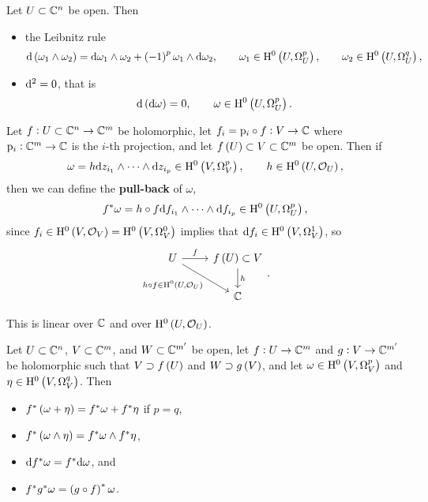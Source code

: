 \begin{proposition}
Let $ U \subset \mathbb{C}^n $ be open. Then
\begin{itemize}
\item the Leibnitz rule
$$ \d\br{\omega_1 \wedge \omega_2} = \d\omega_1 \wedge \omega_2 + \br{-1}^p \omega_1 \wedge \d\omega_2, \qquad \omega_1 \in \H^0\br{U, \Omega_U^p}, \qquad \omega_2 \in \H^0\br{U, \Omega_U^q}, $$
\item $ \mathrm{d}^2 = 0 $, that is
$$ \d\br{\d\omega} = 0, \qquad \omega \in \H^0\br{U, \Omega_U^p}. $$
\end{itemize}
\end{proposition}

\pagebreak

\begin{definition}
Let $ f : U \subset \mathbb{C}^n \to \mathbb{C}^m $ be holomorphic, let $ f_i = \mathrm{p}_i \circ f : V \to \mathbb{C} $ where $ \mathrm{p}_i : \mathbb{C}^m \to \mathbb{C} $ is the $ i $-th projection, and let $ f\br{U} \subset V \subset \CC^m $ be open. Then if
$$ \omega = h \d z_{i_1} \wedge \dots \wedge \d z_{i_p} \in \H^0\br{V, \Omega_V^p}, \qquad h \in \H^0\br{U, \OOO_U}, $$
then we can define the \textbf{pull-back} of $ \omega $,
$$ f^*\omega = h \circ f \d f_{i_1} \wedge \dots \wedge \d f_{i_p} \in \H^0\br{U, \Omega_U^p}, $$
since $ f_i \in \H^0\br{V, \OOO_V} = \H^0\br{V, \Omega_V^0} $ implies that $ \d f_i \in \H^0\br{V, \Omega_V^1} $, so
$$
\begin{tikzcd}
U \arrow{r}{f} \arrow[swap]{dr}{h \circ f \in \H^0\br{U, \OOO_U}} & f\br{U} \subset V \arrow{d}{h} \\
& \CC
\end{tikzcd}.
$$
\end{definition}

This is linear over $ \mathbb{C} $ and over $ \H^0\br{U, \OOO_U} $.

\begin{proposition}
Let $ U \subset \mathbb{C}^n $, $ V \subset \mathbb{C}^m $, and $ W \subset \mathbb{C}^{m'} $ be open, let $ f : U \to \mathbb{C}^m $ and $ g : V \to \mathbb{C}^{m'} $ be holomorphic such that $ V \supset f\br{U} $ and $ W \supset g\br{V} $, and let $ \omega \in \H^0\br{V, \Omega_V^p} $ and $ \eta \in \H^0\br{V, \Omega_V^q} $. Then
\begin{itemize}
\item $ f^*\br{\omega + \eta} = f^*\omega + f^*\eta $ if $ p = q $,
\item $ f^*\br{\omega \wedge \eta} = f^*\omega \wedge f^*\eta $,
\item $ \mathrm{d} f^*\omega = f^*\mathrm{d}\omega $, and
\item $ f^*g^*\omega = \br{g \circ f}^*\omega $.
\end{itemize}
\end{proposition}

